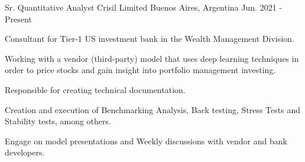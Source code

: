

\begin{cventries}

  \cventry
    {Sr. Quantitative Analyst} %
    {Crisil Limited} %
    {Buenos Aires, Argentina} %
    {Jun. 2021 - Present} %
    {
      \begin{cvitems} %
        \item {Consultant for Tier-1 US investment bank in the Wealth Management Division.}
        \item {Working with a vendor (third-party) model that uses deep learning techniques in order to price stocks and gain insight into portfolio management investing.}
        \item {Responsible for creating technical documentation.}
        \item {Creation and execution of Benchmarking Analysis, Back testing, Stress Tests and Stability tests, among others.}
        \item {Engage on model presentations and Weekly discussions with vendor and bank developers.}
      \end{cvitems}
    }


\end{cventries}
